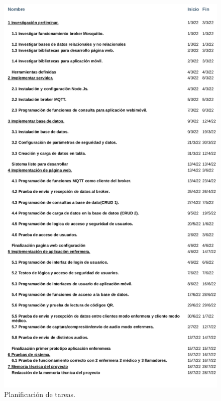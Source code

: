 \documentclass[
11pt, %
]{charter}
\begin{document}
\begin{figure}
\centering 
\includegraphics[height=.85\textheight]{./Figuras/Tareas-desc.pdf}
\caption{Planificación de tareas.}
\label{fig:diagGantt0}
\end{figure}


\end{document}
